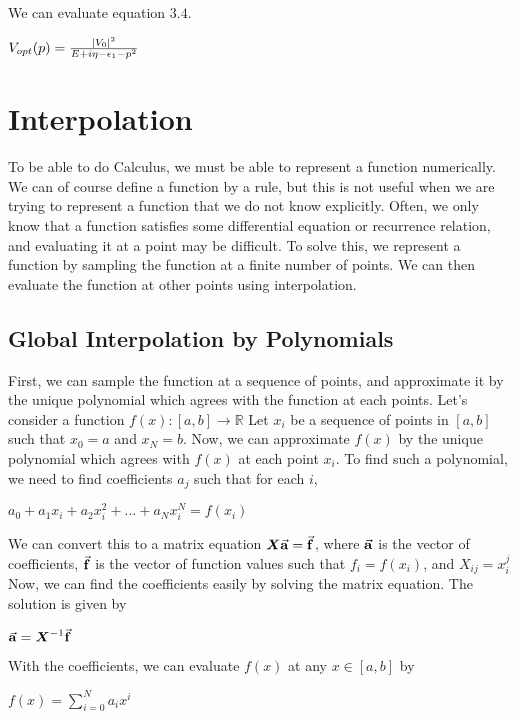 \documentclass[12pt,letterpaper]{article}
\numberwithin{equation}{section}
\newcommand{\reals}{\mathbb{R}}
\begin{document}
\noindent We can evaluate equation $3.4$.
\begin{center}
$V_{opt}(p) = \frac{\abs{V_{0}}^2}{E + i\eta - \epsilon_1 - p^2}$
\end{center}

\newpage
\appendix

\section{Interpolation}
To be able to do Calculus, we must be able to represent a function numerically. We can of course define a function by a rule, but this is not useful when we are trying to represent a function that we do not know explicitly. Often, we only know that a function satisfies some differential equation or recurrence relation, and evaluating it at a point may be difficult. To solve this, we represent a function by sampling the function at a finite number of points. We can then evaluate the function at other points using interpolation.

\subsection{Global Interpolation by Polynomials}
First, we can sample the function at a sequence of points, and approximate it by the unique polynomial which agrees with the function at each points. Let's consider a function $f(x) : [a,b] \rightarrow \reals$ Let $x_i$ be a sequence of points in $[a,b]$ such that $x_0 = a$ and $x_N = b$. Now, we can approximate $f(x)$ by the unique polynomial which agrees with $f(x)$ at each point $x_i$. To find such a polynomial, we need to find coefficients $a_j$ such that for each $i$,
\begin{center}
$a_0 + a_1 x_i + a_2 x_i^2 + ... + a_N x_i^N = f(x_i)$
\end{center}

\indent We can convert this to a matrix equation $\boldsymbol{X}\va{a} = \va{f}$, where $\va{a}$ is the vector of coefficients, $\va{f}$ is the vector of function values such that $f_i = f(x_i)$, and $X_{ij} = x_i^j$ Now, we can find the coefficients easily by solving the matrix equation. The solution is given by 
\begin{center}
$\va{a} = \boldsymbol{X}^{-1} \va{f}$
\end{center}
With the coefficients, we can evaluate $f(x)$ at any $x \in [a,b]$ by
\begin{center}
$f(x) = \sum_{i=0}^{N} a_i x^i$ 
\end{center}
\end{document}
